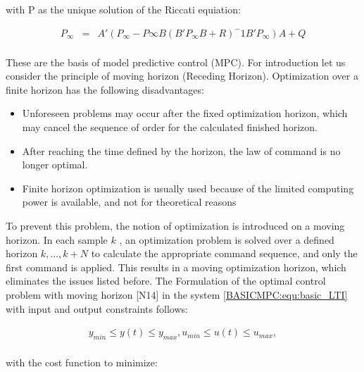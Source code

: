 		with P as the unique solution of the Riccati equiation:
		
		\begin{equation}
        \begin{array}{rcl}
				P_\infty&=&A'(P_\infty-P\infty B(B'P_\infty B+R)^-1B'P_\infty)A+Q\\
        \end{array}
        \label{BASICMPC:equ:Riccati_infinite}
    \end{equation}
		
		These are the basis of model predictive control (MPC). For introduction let us consider the principle of moving horizon (Receding Horizon). Optimization over a finite horizon has the following disadvantages:
		
		\begin{itemize}
			\item Unforeseen problems may occur after the fixed optimization horizon, which may cancel the sequence of order for the 		calculated finished horizon.
		\item After reaching the time defined by the horizon, the law of command is no longer optimal.
		\item Finite horizon optimization is usually used because of the limited computing power is available, and not for theoretical reasons 
		\end{itemize}
		
		To prevent this problem, the notion of optimization is introduced on a moving horizon. In each sample $k$ , an optimization problem is solved over a defined horizon $k,\dots,k+N$ to calculate the appropriate command sequence, and only the first command is applied. This results in a moving optimization horizon, which eliminates the issues listed before. The Formulation of the optimal control problem with moving horizon [N14] in the system \ref{BASICMPC:equ:basic_LTI} with input and output constraints follows:
		
		\begin{equation}
        \begin{array}{c}
				y_{min}\leq y(t)\leq y_{max},u_{min}\leq u(t)\leq u_{max},\\
        \end{array}
        \label{BASICMPC:equ:receiding_horison_constraints}
    \end{equation}
		
		
with the cost function to minimize:
		
